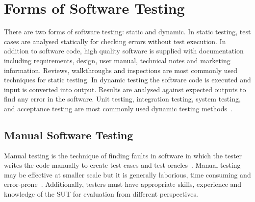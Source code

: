 \section{Forms of Software Testing}
There are two forms of software testing: static and dynamic. In static testing, test cases are analysed statically for checking errors without test execution. In addition to software code, high quality software is supplied with documentation including requirements, design, user manual, technical notes and marketing information. Reviews, walkthroughs and inspections are most commonly used techniques for static testing. In dynamic testing the software code is executed and input is converted into output. Results are analysed against expected outputs to find any error in the software. Unit testing, integration testing, system testing, and acceptance testing are most commonly used dynamic testing methods~\cite{fairley1978tutorial}.


\subsection{Manual Software Testing}
Manual testing is the technique of finding faults in software in which the tester writes the code manually to create test cases and test oracles~\cite{ciupa2008finding}. Manual testing may be effective at smaller scale but it is generally laborious, time consuming and error-prone~\cite{tretmans2000automatic}. Additionally, testers must have appropriate skills, experience and knowledge of the SUT for evaluation from different perspectives.
 
